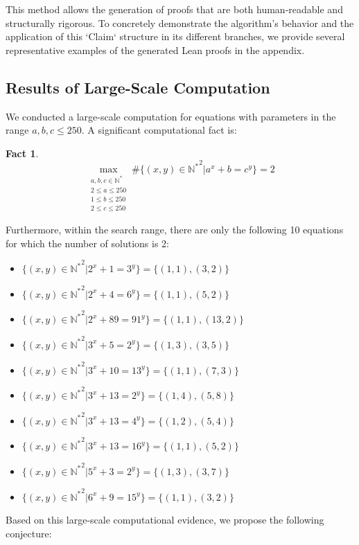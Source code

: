 \documentclass{article}
\newtheorem{fact}[theorem]{Fact}
\begin{document}
This method allows the generation of proofs that are both human-readable and structurally rigorous. To concretely demonstrate the algorithm's behavior and the application of this `Claim` structure in its different branches, we provide several representative examples of the generated Lean proofs in the appendix.

\subsection{Results of Large-Scale Computation}
We conducted a large-scale computation for equations with parameters in the range $a, b, c \le 250$. A significant computational fact is:

\begin{fact}
$$ \max_{\substack{a, b, c\in \mathbb{N}^*\\2\le a\le 250\\ 1 \le b \le 250 \\ 2 \le c \le 250}}\#\{(x, y)\in\mathbb{N^*}^2|a^x+b=c^y\}=2 $$
\end{fact}

Furthermore, within the search range, there are only the following 10 equations for which the number of solutions is 2:
\begin{itemize}
    \item $\{(x, y)\in\mathbb{N^*}^2|2^x+1=3^y\}=\{(1, 1), (3, 2)\}$
    \item $\{(x, y)\in\mathbb{N^*}^2|2^x+4=6^y\}=\{(1, 1), (5, 2)\}$
    \item $\{(x, y)\in\mathbb{N^*}^2|2^x+89=91^y\}=\{(1, 1), (13, 2)\}$
    \item $\{(x, y)\in\mathbb{N^*}^2|3^x+5=2^y\}=\{(1, 3), (3, 5)\}$
    \item $\{(x, y)\in\mathbb{N^*}^2|3^x+10=13^y\}=\{(1, 1), (7, 3)\}$
    \item $\{(x, y)\in\mathbb{N^*}^2|3^x+13=2^y\}=\{(1, 4), (5, 8)\}$
    \item $\{(x, y)\in\mathbb{N^*}^2|3^x+13=4^y\}=\{(1, 2), (5, 4)\}$
    \item $\{(x, y)\in\mathbb{N^*}^2|3^x+13=16^y\}=\{(1, 1), (5, 2)\}$
    \item $\{(x, y)\in\mathbb{N^*}^2|5^x+3=2^y\}=\{(1, 3), (3, 7)\}$
    \item $\{(x, y)\in\mathbb{N^*}^2|6^x+9=15^y\}=\{(1, 1), (3, 2)\}$
\end{itemize}

Based on this large-scale computational evidence, we propose the following conjecture:
\end{document}

